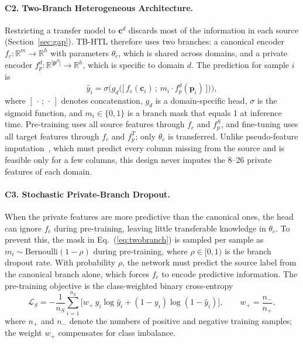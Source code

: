 \documentclass[runningheads]{llncs}
\begin{document}
\paragraph{C2. Two-Branch Heterogeneous Architecture.}
Restricting a transfer model to $\mathbf{c}^d$ discards most of the information in each source (Section~\ref{sec:gap}). TB-HTL therefore uses two branches: a canonical encoder $f_c:\mathbb{R}^{m}\to\mathbb{R}^{h}$ with parameters $\theta_c$, which is shared across domains, and a private encoder $f_p^d:\mathbb{R}^{|\mathbf{p}^d|}\to\mathbb{R}^{h}$, which is specific to domain $d$. The prediction for sample $i$ is
\begin{equation}\label{eq:twobranch}
\hat{y}_i=\sigma\!\Big(g_d\big(\big[\,f_c(\mathbf{c}_i)\,;\,m_i\cdot f_p^d(\mathbf{p}_i)\,\big]\big)\Big),
\end{equation}
where $[\,\cdot\,;\,\cdot\,]$ denotes concatenation, $g_d$ is a domain-specific head, $\sigma$ is the sigmoid function, and $m_i\in\{0,1\}$ is a branch mask that equals 1 at inference time. Pre-training uses all source features through $f_c$ and $f_p^S$, and fine-tuning uses all target features through $f_c$ and $f_p^T$; only $\theta_c$ is transferred. Unlike pseudo-feature imputation~\cite{levin2023}, which must predict every column missing from the source and is feasible only for a few columns, this design never imputes the 8--26 private features of each domain.

\paragraph{C3. Stochastic Private-Branch Dropout.}
When the private features are more predictive than the canonical ones, the head can ignore $f_c$ during pre-training, leaving little transferable knowledge in $\theta_c$. To prevent this, the mask in Eq.~(\ref{eq:twobranch}) is sampled per sample as $m_i\sim\mathrm{Bernoulli}(1-\rho)$ during pre-training, where $\rho\in[0,1)$ is the branch dropout rate. With probability $\rho$, the network must predict the source label from the canonical branch alone, which forces $f_c$ to encode predictive information. The pre-training objective is the class-weighted binary cross-entropy
\begin{equation}\label{eq:wbce}
\mathcal{L}_S=-\frac{1}{n_S}\sum_{i=1}^{n_S}\Big[w_{+}\,y_i\log\hat{y}_i+(1-y_i)\log(1-\hat{y}_i)\Big],\qquad w_{+}=\frac{n_{-}}{n_{+}},
\end{equation}
where $n_{+}$ and $n_{-}$ denote the numbers of positive and negative training samples; the weight $w_{+}$ compensates for class imbalance.
\end{document}
